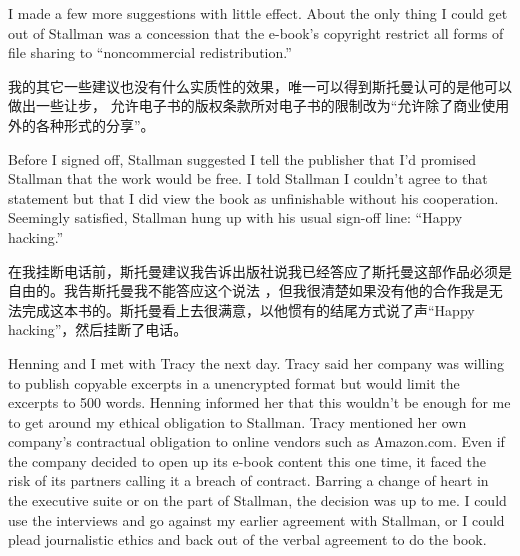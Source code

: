 
\ifdefined\eng
I made a few more suggestions with little effect. About the only thing I could get out of Stallman was a concession %
that the e-book's copyright restrict all forms of file sharing to ``noncommercial redistribution.''
\fi

\ifdefined\chs
我的其它一些建议也没有什么实质性的效果，唯一可以得到斯托曼认可的是他可以做出一些让步，%
允许电子书的版权条款所对电子书的限制改为“允许除了商业使用外的各种形式的分享”。
\fi

\ifdefined\eng
Before I signed off, Stallman suggested I tell the publisher that I'd promised Stallman that the work would be free. I told Stallman I couldn't agree to that statement %
but that I did view the book as unfinishable without his cooperation. Seemingly satisfied, Stallman hung up with his usual sign-off line: ``Happy hacking.''
\fi

\ifdefined\chs
在我挂断电话前，斯托曼建议我告诉出版社说我已经答应了斯托曼这部作品必须是自由的。我告斯托曼我不能答应这个说法%
，但我很清楚如果没有他的合作我是无法完成这本书的。斯托曼看上去很满意，以他惯有的结尾方式说了声“Happy hacking”，然后挂断了电话。
\fi

\ifdefined\eng
Henning and I met with Tracy the next day. Tracy said her company was willing to publish copyable excerpts in a unencrypted format but would limit the excerpts to 500 words. Henning informed her that this wouldn't be enough for me to get around my ethical obligation to Stallman. Tracy mentioned her own company's contractual obligation to online vendors such as Amazon.com. Even if the company decided to open up its e-book content this one time, it faced the risk of its partners calling it a breach of contract. Barring a change of heart in the executive suite or on the part of Stallman, the decision was up to me. I could use the interviews and go against my earlier agreement with Stallman, or I could plead journalistic ethics and back out of the verbal agreement to do the book.
\fi

